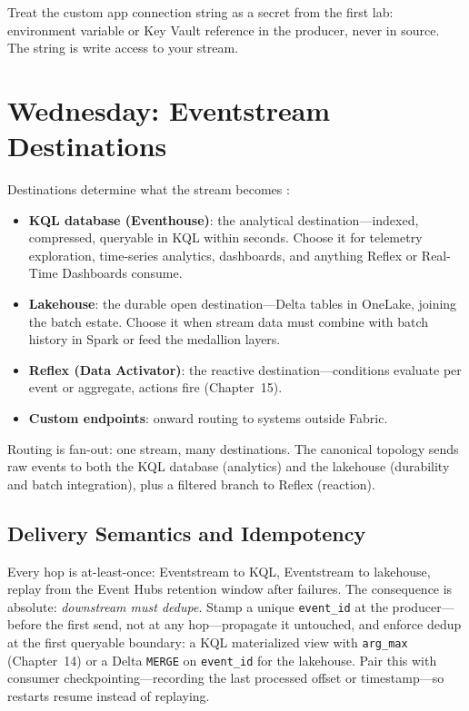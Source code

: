 \begin{tipbox}
Treat the custom app connection string as a secret from the first lab: environment variable or Key Vault reference in the producer, never in source. The string is write access to your stream.
\end{tipbox}

\section{Wednesday: Eventstream Destinations}
Destinations determine what the stream becomes \cite{microsoftFabricEventstreams}:

\begin{itemize}
    \item \textbf{KQL database (Eventhouse)}: the analytical destination---indexed, compressed, queryable in KQL within seconds. Choose it for telemetry exploration, time-series analytics, dashboards, and anything Reflex or Real-Time Dashboards consume.
    \item \textbf{Lakehouse}: the durable open destination---Delta tables in OneLake, joining the batch estate. Choose it when stream data must combine with batch history in Spark or feed the medallion layers.
    \item \textbf{Reflex (Data Activator)}: the reactive destination---conditions evaluate per event or aggregate, actions fire (Chapter~15).
    \item \textbf{Custom endpoints}: onward routing to systems outside Fabric.
\end{itemize}

Routing is fan-out: one stream, many destinations. The canonical topology sends raw events to both the KQL database (analytics) and the lakehouse (durability and batch integration), plus a filtered branch to Reflex (reaction).

\subsection{Delivery Semantics and Idempotency}
Every hop is at-least-once: Eventstream to KQL, Eventstream to lakehouse, replay from the Event Hubs retention window after failures. The consequence is absolute: \emph{downstream must dedupe}. Stamp a unique \texttt{event\_id} at the producer---before the first send, not at any hop---propagate it untouched, and enforce dedup at the first queryable boundary: a KQL materialized view with \texttt{arg\_max} (Chapter~14) or a Delta \texttt{MERGE} on \texttt{event\_id} for the lakehouse. Pair this with consumer checkpointing---recording the last processed offset or timestamp---so restarts resume instead of replaying.

